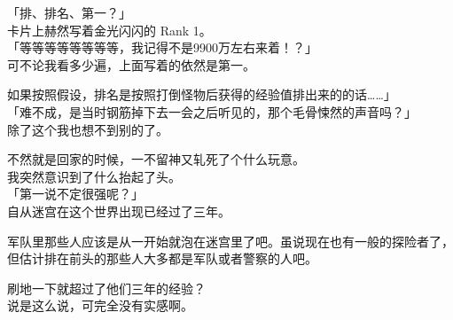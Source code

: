 「排、排名、第一？」\\

卡片上赫然写着金光闪闪的 Rank 1。\\

「等等等等等等等等，我记得不是9900万左右来着！？」\\

可不论我看多少遍，上面写着的依然是第一。

如果按照假设，排名是按照打倒怪物后获得的经验值排出来的的话……」\\

「难不成，是当时钢筋掉下去一会之后听见的，那个毛骨悚然的声音吗？」\\

除了这个我也想不到别的了。

不然就是回家的时候，一不留神又轧死了个什么玩意。\\

我突然意识到了什么抬起了头。\\

「第一说不定很强呢？」\\

自从迷宫在这个世界出现已经过了三年。

军队里那些人应该是从一开始就泡在迷宫里了吧。虽说现在也有一般的探险者了，但估计排在前头的那些人大多都是军队或者警察的人吧。

刷地一下就超过了他们三年的经验？\\

说是这么说，可完全没有实感啊。\\

